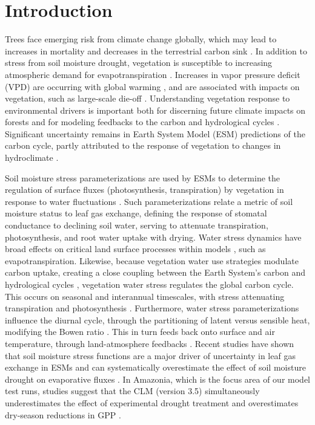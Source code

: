\documentclass[draft,linenumbers]{agujournal}
\begin{document}

\section{Introduction}

Trees face emerging risk from climate change globally, which may lead to increases in mortality and decreases in the terrestrial carbon sink \citep{allen2010,anderegg2013b,mcdowell2016}.
In addition to stress from soil moisture drought, vegetation is susceptible to increasing atmospheric demand for evapotranspiration \citep{restaino2016,novick2016b,lemordant2018}.
Increases in vapor pressure deficit (VPD) are occurring with global warming \citep{ficklin2017,seager2015}, and are associated with impacts on vegetation, such as large-scale die-off \citep{williams2013,mcdowell2015}.
Understanding vegetation response to environmental drivers is important both for discerning future climate impacts on forests and for modeling feedbacks to the carbon and hydrological cycles \citep{lemordant2018}.
Significant uncertainty remains in Earth System Model (ESM) predictions of the carbon cycle, partly attributed to the response of vegetation to changes in hydroclimate \citep{dekauwe2017,friedlingstein2014,trugman2018}.

Soil moisture stress parameterizations are used by ESMs to determine the regulation of surface fluxes (photosynthesis, transpiration) by vegetation in response to water fluctuations \citep{egea2011,verhoef2014}.
Such parameterizations relate a metric of soil moisture status to leaf gas exchange, defining the response of stomatal conductance to declining soil water, serving to attenuate transpiration, photosynthesis, and root water uptake with drying.
Water stress dynamics have broad effects on critical land surface processes within models \citep{joetzjer2014}, such as evapotranspiration.
Likewise, because vegetation water use strategies modulate carbon uptake, creating a close coupling between the Earth System's carbon and hydrological cycles \citep{green2017}, vegetation water stress regulates the global carbon cycle.
This occurs on seasonal and interannual timescales, with stress attenuating transpiration \citep{dekauwe2015} and photosynthesis \citep{stocker2018}.
Furthermore, water stress parameterizations influence the diurnal cycle, through the partitioning of latent versus sensible heat, modifying the Bowen ratio \citep{gentine2007,gentine2011}. 
This in turn feeds back onto surface and air temperature, through land-atmosphere feedbacks \citep{bonan2008,seneviratne2006}.
Recent studies have shown that soil moisture stress functions are a major driver of uncertainty in leaf gas exchange in ESMs \citep{trugman2018} and can systematically overestimate the effect of soil moisture drought on evaporative fluxes \citep{ukkola2016,bonan2014}.
In Amazonia, which is the focus area of our model test runs, studies suggest that the CLM (version 3.5) simultaneously underestimates the effect of experimental drought treatment \citep{powell2013} and overestimates dry-season reductions in GPP \citep{restrepo2017}.
\end{document}
